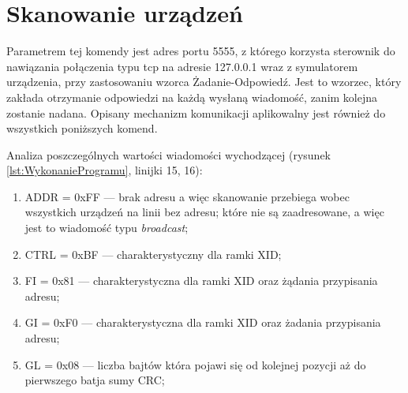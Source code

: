 \section{Skanowanie urządzeń}
Parametrem tej komendy jest adres portu 5555, z którego korzysta sterownik
do nawiązania połączenia typu tcp na adresie 127.0.0.1 wraz z symulatorem urządzenia,
przy zastosowaniu wzorca Żadanie-Odpowiedź. Jest to wzorzec, który zakłada otrzymanie odpowiedzi na każdą wysłaną wiadomość, zanim kolejna zostanie nadana. 
Opisany mechanizm komunikacji aplikowalny jest również do wszystkich poniższych komend.

Analiza poszczególnych wartości wiadomości wychodzącej (rysunek \ref{lst:WykonanieProgramu}, linijki {15, 16}):
\begin{enumerate}
    \item ADDR = 0xFF --- brak adresu a więc skanowanie przebiega wobec wszystkich urządzeń na linii bez adresu; 
    które nie są zaadresowane, a więc jest to wiadomość typu \textit{broadcast};
    \item CTRL = 0xBF --- charakterystyczny dla ramki XID;
    \item FI = 0x81 --- charakterystyczna dla ramki XID oraz żądania przypisania adresu;
    \item GI = 0xF0 --- charakterystyczna dla ramki XID oraz żadania przypisania adresu;
    \item GL = 0x08 --- liczba bajtów która pojawi się od kolejnej pozycji aż do pierwszego batja sumy CRC;
\end{enumerate}

